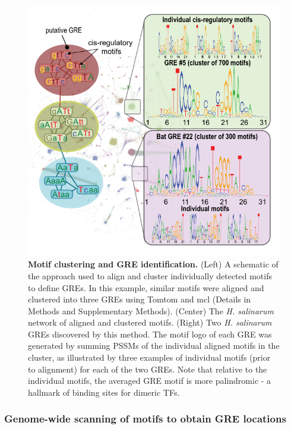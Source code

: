 \begin{figure}[h!]
\centering
\includegraphics[width=0.6\linewidth]{figures/gre_clustering.pdf}
\caption[Motif clustering and GRE identification]{
\textbf{Motif clustering and GRE identification.} 
(Left) A schematic of the approach used to align and cluster
individually detected motifs to define GREs. In this example, similar
motifs were aligned and clustered into three GREs using Tomtom and mcl
(Details in Methods and Supplementary Methods). (Center) The {\it
H. salinarum} network of aligned and clustered motifs. (Right) Two
{\it H. salinarum} GREs discovered by this method. The motif logo of
each GRE was generated by summing PSSMs of the individual aligned
motifs in the cluster, as illustrated by three examples of individual
motifs (prior to alignment) for each of the two GREs. Note that
relative to the individual motifs, the averaged GRE motif is more
palindromic - a hallmark of binding sites for dimeric TFs.}
\label{fig:gre_clustering}
\end{figure}

\subsubsection{Genome-wide scanning of motifs to obtain GRE locations}
\label{section:scanning}

